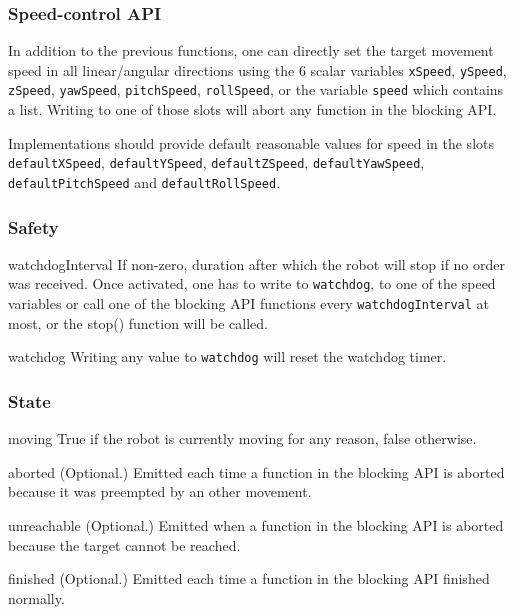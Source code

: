 \subsubsection{Speed-control API}

In addition to the previous functions, one can directly set the target
movement speed in all linear/angular directions using the 6 scalar variables
\lstinline{xSpeed}, \lstinline{ySpeed}, \lstinline{zSpeed},
\lstinline{yawSpeed}, \lstinline{pitchSpeed}, \lstinline{rollSpeed}, or the
variable \lstinline{speed} which contains a list.  Writing to one of those
slots will abort any function in the blocking API.

Implementations should provide default reasonable values for speed in the
slots \lstinline{defaultXSpeed}, \lstinline{defaultYSpeed},
\lstinline{defaultZSpeed}, \lstinline{defaultYawSpeed},
\lstinline{defaultPitchSpeed} and \lstinline{defaultRollSpeed}.

\subsubsection{Safety}

\begin{urbiscriptapi}

\item{watchdogInterval} If non-zero, duration after which the robot will
  stop if no order was received. Once activated, one has to write to
  \lstinline|watchdog|, to one of the speed variables or call one of the
  blocking API functions every \lstinline|watchdogInterval| at most, or the
  stop() function will be called.
\item{watchdog} Writing any value to \lstinline|watchdog| will reset the
  watchdog timer.
\end{urbiscriptapi}

\subsubsection{State}

\begin{urbiscriptapi}
\item[moving] True if the robot is currently moving for any reason, false
  otherwise.
\item[aborted] (Optional.) Emitted each time a function in the blocking API
  is aborted because it was preempted by an other movement.
\item[unreachable] (Optional.) Emitted when a function in the blocking API
  is aborted because the target cannot be reached.
\item[finished] (Optional.) Emitted each time a function in the blocking API
  finished normally.

\end{urbiscriptapi}

